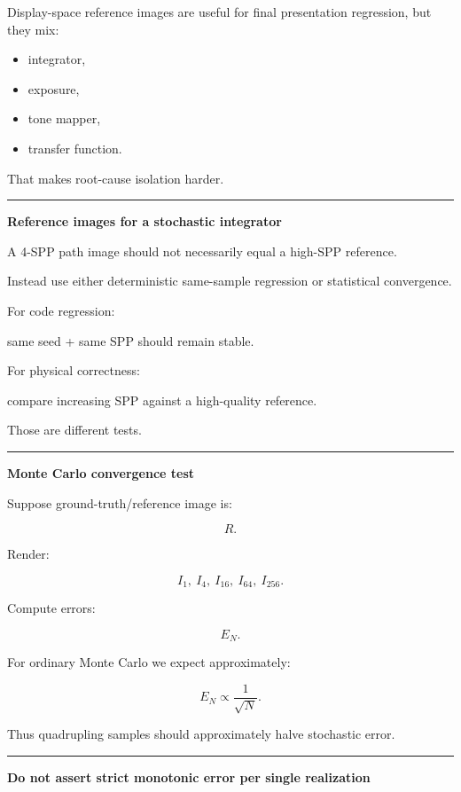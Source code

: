 Display-space reference images are useful for final presentation regression, but they mix:

\begin{itemize}
\tightlist
\item
  integrator,
\item
  exposure,
\item
  tone mapper,
\item
  transfer function.
\end{itemize}

That makes root-cause isolation harder.

\begin{center}\rule{0.5\linewidth}{0.5pt}\end{center}

\textbf{Reference images for a stochastic integrator}

A 4-SPP path image should not necessarily equal a high-SPP reference.

Instead use either deterministic same-sample regression or statistical convergence.

For code regression:

same seed + same SPP should remain stable.

For physical correctness:

compare increasing SPP against a high-quality reference.

Those are different tests.

\begin{center}\rule{0.5\linewidth}{0.5pt}\end{center}

\textbf{Monte Carlo convergence test}

Suppose ground-truth/reference image is:

\[
R.
\]

Render:

\[
I_1,\ I_4,\ I_{16},\ I_{64},\ I_{256}.
\]

Compute errors:

\[
E_N.
\]

For ordinary Monte Carlo we expect approximately:

\[
\boxed{
E_N
\propto
\frac1{\sqrt N}.
}
\]

Thus quadrupling samples should approximately halve stochastic error.

\begin{center}\rule{0.5\linewidth}{0.5pt}\end{center}

\textbf{Do not assert strict monotonic error per single realization}

